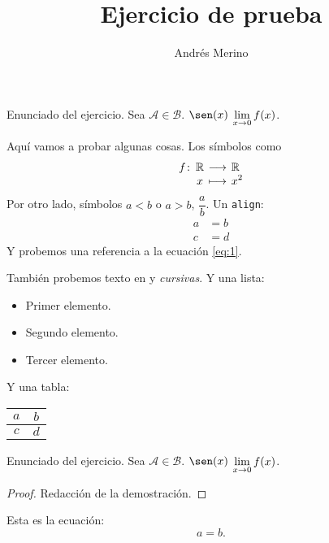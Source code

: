 \documentclass[a4,10pt]{aleph-notas}
\title{Ejercicio de prueba}
\author{Andrés Merino}
\newcommand{\A}{\mathcal{A}}
\newcommand{\B}{\mathcal{B}}
\begin{document}
\encabezado


\begin{ejer}
    Enunciado del ejercicio. Sea $\A \in \B$. $\sen(x)$ $\displaystyle\lim_{x\to 0} f(x)$.
\end{ejer}


Aquí vamos a probar algunas cosas. Los símbolos como 
\[
    \funcion{f}{\R}{\R}{x}{x^2}
\]
Por otro lado, símbolos $a<b$ o $a>b$, $\dfrac{a}{b}$. Un \texttt{align}:
\begin{align*}
    a &= b\\
    c &= d
\end{align*}
Y probemos una referencia a la ecuación \eqref{eq:1}.

También probemos texto en  y \textit{cursivas}. Y una lista:
\begin{itemize}
    \item Primer elemento.
    \item Segundo elemento.
    \item Tercer elemento.
\end{itemize}
Y una tabla:
\begin{center}
    \begin{tabular}[h]{|c|c|}
        \hline
        $a$ & $b$\\
        \hline
        $c$ & $d$\\
        \hline
    \end{tabular}
\end{center}



\begin{ejer}
    Enunciado del ejercicio. Sea $\A \in \B$. $\sen(x)$ $\displaystyle\lim_{x\to 0} f(x)$.
\end{ejer}

\begin{proof}
    Redacción de la demostración.\qedhere
\end{proof}

Esta es la ecuación:
\begin{equation}
    a = b.
    \label{eq:1}
\end{equation}
\end{document}
